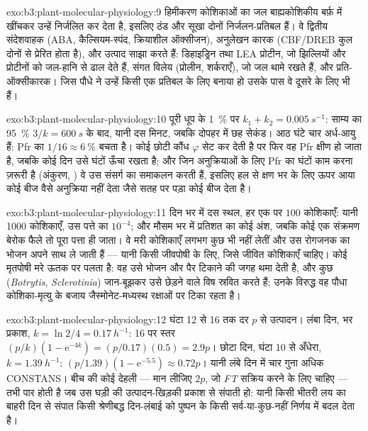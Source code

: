 \begin{solution}{exo:b3:plant-molecular-physiology:9}
हिमीकरण कोशिकाओं का जल बाह्यकोशिकीय बर्फ़ में खींचकर उन्हें निर्जलित
कर देता है, इसलिए ठंड और सूखा दोनों निर्जलन-प्रतिबल हैं। वे द्वितीय
संदेशवाहक (ABA, कैल्सियम-स्पंद, क्रियाशील ऑक्सीजन), अनुलेखन कारक
(CBF/DREB कुल दोनों से प्रेरित होता है), और उत्पाद साझा करते हैं:
डिहाइड्रिन तथा LEA प्रोटीन, जो झिल्लियों और प्रोटीनों को जल-हानि से
ढाल देते हैं, संगत विलेय (प्रोलीन, शर्कराएँ), जो जल थामे रखते हैं, और
प्रति-ऑक्सीकारक। जिस पौधे ने उन्हें किसी एक प्रतिबल के लिए बनाया हो
उसके पास वे दूसरे के लिए भी हैं।
\end{solution}

\begin{solution}{exo:b3:plant-molecular-physiology:10}
पूरी धूप के \qty{1}{\%} पर $k_{1} + k_{2} = \qty{0.005}{s^{-1}}$:
साम्य का 95~\% $3/k = \qty{600}{s}$ के बाद, यानी दस मिनट, जबकि दोपहर
में छह सेकंड। आठ घंटे चार अर्ध-आयु हैं: Pfr का $1/16 \approx
\qty{6}{\%}$ बचता है। कोई छोटी कौंध $\varphi$ सेट कर देती है पर फिर वह
Pfr क्षीण हो जाता है, जबकि कोई दिन उसे घंटों ऊँचा रखता है; और जिन
अनुक्रियाओं के लिए Pfr का घंटों काम करना ज़रूरी है (अंकुरण, ) वे
उस संसर्ग का समाकलन करती हैं, इसलिए हल से क्षण भर के लिए ऊपर आया कोई
बीज वैसे अनुक्रिया नहीं देता जैसे सतह पर पड़ा कोई बीज देता है।
\end{solution}

\begin{solution}{exo:b3:plant-molecular-physiology:11}
दिन भर में दस स्थल, हर एक पर $100$ कोशिकाएँ: यानी \num{1000} कोशिकाएँ,
उस पत्ते का $10^{-4}$; और मौसम भर में प्रतिशत का कोई अंश, जबकि कोई एक
संक्रमण बेरोक फैले तो पूरा पत्ता ही जाता। वे मरी कोशिकाएँ लगभग कुछ भी
नहीं लेतीं और उस रोगजनक का भोजन अपने साथ ले जाती हैं --- यानी किसी
जीवपोषी के लिए, जिसे जीवित कोशिकाएँ चाहिए। कोई मृतपोषी मरे ऊतक पर पलता
है: वह  उसे भोजन और पैर टिकाने की जगह थमा देती है,
और कुछ (\emph{Botrytis}, \emph{Sclerotinia}) जान-बूझकर उसे छेड़ने वाले
विष स्रवित करते हैं; उनके विरुद्ध वह पौधा कोशिका-मृत्यु के बजाय
जैस्मोनेट-मध्यस्थ रक्षाओं पर टिका रहता है।
\end{solution}

\begin{solution}{exo:b3:plant-molecular-physiology:12}
घंटा 12 से 16 तक दर $p$ से उत्पादन। लंबा दिन, भर प्रकाश,
$k = \ln 2/4 = \qty{0.17}{h^{-1}}$: 16 पर स्तर $(p/k)(1 -
\mathrm{e}^{-4k}) = (p/0.17)(0.5) = 2.9p$। छोटा दिन, घंटा 10 से
अँधेरा, $k = \qty{1.39}{h^{-1}}$: $(p/1.39)(1 - \mathrm{e}^{-5.5})
\approx 0.72p$। यानी लंबे दिन में चार गुना अधिक CONSTANS। बीच की कोई
देहली --- मान लीजिए $2p$, जो \emph{FT} सक्रिय करने के लिए चाहिए --- तभी
पार होती है जब उस घड़ी की उत्पादन-खिड़की प्रकाश से संपाती हो: यानी किसी
भीतरी लय का बाहरी दिन से संपात किसी श्रेणीबद्ध दिन-लंबाई को पुष्पन के
किसी सर्व-या-कुछ-नहीं निर्णय में बदल देता है।
\end{solution}

